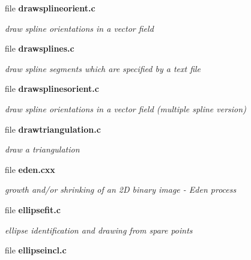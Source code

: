 \begin{DoxyCompactItemize}
\item 
file {\bf drawsplineorient.c}


\begin{DoxyCompactList}\small\item\em draw spline orientations in a vector field \item\end{DoxyCompactList}

\item 
file {\bf drawsplines.c}


\begin{DoxyCompactList}\small\item\em draw spline segments which are specified by a text file \item\end{DoxyCompactList}

\item 
file {\bf drawsplinesorient.c}


\begin{DoxyCompactList}\small\item\em draw spline orientations in a vector field (multiple spline version) \item\end{DoxyCompactList}

\item 
file {\bf drawtriangulation.c}


\begin{DoxyCompactList}\small\item\em draw a triangulation \item\end{DoxyCompactList}

\item 
file {\bf eden.cxx}


\begin{DoxyCompactList}\small\item\em growth and/or shrinking of an 2D binary image -\/ Eden process \item\end{DoxyCompactList}

\item 
file {\bf ellipsefit.c}


\begin{DoxyCompactList}\small\item\em ellipse identification and drawing from spare points \item\end{DoxyCompactList}

\item 
file {\bf ellipseincl.c}



\end{DoxyCompactItemize}

